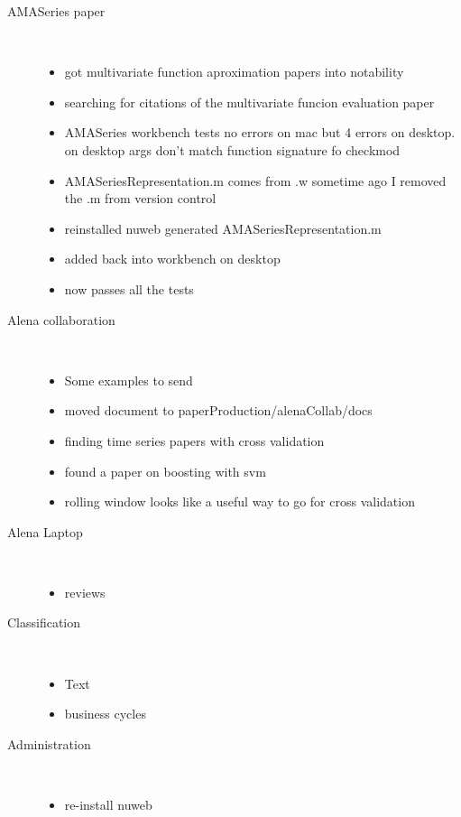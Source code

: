 \documentclass[hyperref]{labbook}
\begin{document}
\begin{description}
\item[AMASeries paper] \ 
  \begin{itemize}
  \item got multivariate function aproximation papers into notability
  \item searching for citations of the multivariate funcion evaluation paper
  \item AMASeries workbench tests no errors on mac but 4 errors on desktop. on desktop args don't match function signature fo checkmod
  \item AMASeriesRepresentation.m comes from .w sometime ago I removed the .m from version control
  \item reinstalled nuweb generated AMASeriesRepresentation.m 
  \item added back into workbench on desktop 
  \item now passes all the tests
  \end{itemize}
\item[Alena collaboration] \ 
  \begin{itemize}
  \item Some examples to send
  \item moved document to paperProduction/alenaCollab/docs
  \item finding time series papers with cross validation
  \item found a paper on boosting with svm
  \item rolling window looks like a useful way to go for cross validation
  \end{itemize}
\item[Alena Laptop] \ 
  \begin{itemize}
  \item reviews
  \end{itemize}
\item[Classification]\ 

  \begin{itemize}
  \item Text
  \item business cycles
  \end{itemize}
\item[Administration] \ 

  \begin{itemize}
  \item re-install nuweb
  \end{itemize}
\end{description}
\end{document}
